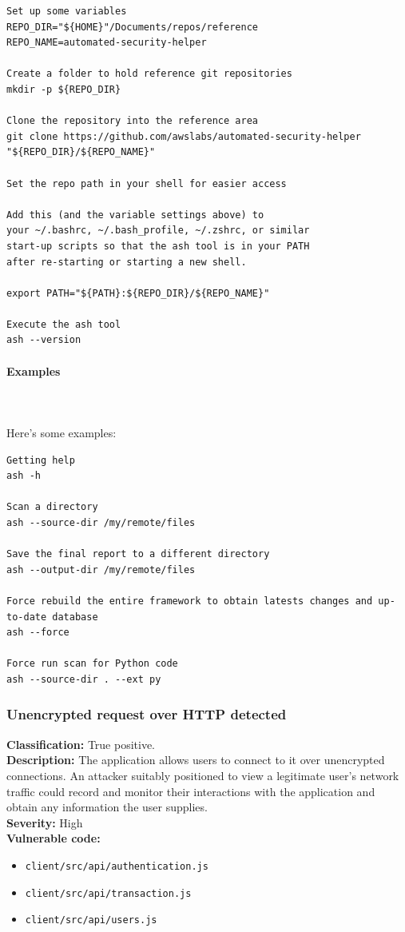 \documentclass[]{article}
\begin{document}
\begin{lstlisting}[numbers=none]
Set up some variables
REPO_DIR="${HOME}"/Documents/repos/reference
REPO_NAME=automated-security-helper

Create a folder to hold reference git repositories
mkdir -p ${REPO_DIR}

Clone the repository into the reference area
git clone https://github.com/awslabs/automated-security-helper "${REPO_DIR}/${REPO_NAME}"

Set the repo path in your shell for easier access

Add this (and the variable settings above) to
your ~/.bashrc, ~/.bash_profile, ~/.zshrc, or similar
start-up scripts so that the ash tool is in your PATH
after re-starting or starting a new shell.

export PATH="${PATH}:${REPO_DIR}/${REPO_NAME}"

Execute the ash tool
ash --version
\end{lstlisting}

\paragraph{Examples} \mbox{} \\ \\
Here's some examples:
\begin{lstlisting}[numbers=none]
Getting help
ash -h

Scan a directory
ash --source-dir /my/remote/files

Save the final report to a different directory
ash --output-dir /my/remote/files

Force rebuild the entire framework to obtain latests changes and up-to-date database
ash --force

Force run scan for Python code
ash --source-dir . --ext py
\end{lstlisting}

\subsubsection{Unencrypted request over HTTP detected}
\textbf{Classification:} {True positive.} \\
\textbf{Description:}  The application allows users to connect to it over unencrypted connections. An attacker suitably positioned to view a legitimate user's network traffic could record and monitor their interactions with the application and obtain any information the user supplies. \\ 
\textbf{Severity:}  High \\ 
\textbf{Vulnerable code:}
\begin{itemize}
    \item \texttt{client/src/api/authentication.js}
    \item \texttt{client/src/api/transaction.js}
    \item \texttt{client/src/api/users.js}
\end{itemize}
\end{document}

